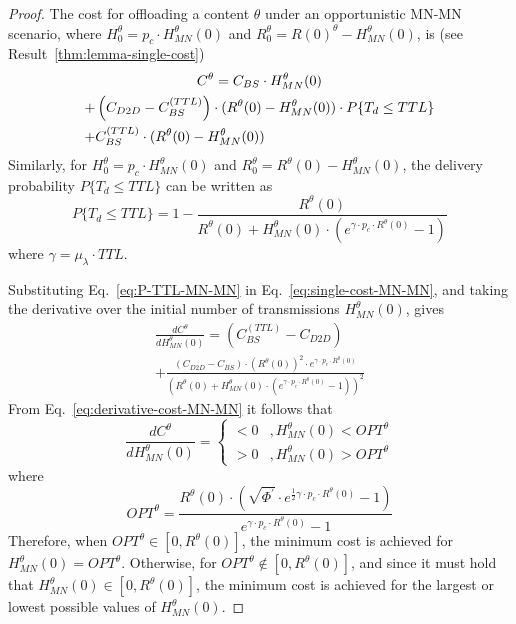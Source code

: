 \documentclass[10pt,conference,letterpaper]{IEEEtran}
\newcommand{\eq}[1]{Eq.~\eqref{#1}}
\begin{document}
\begin{proof}
The cost for offloading a content $\theta$ under an opportunistic MN-MN scenario, where $H_{0}^{\theta} = p_{c}\cdot H_{MN}^{\theta}(0)$ and $R_{0}^{\theta} = R(0)^{\theta}-H_{MN}^{\theta}(0)$, is (see Result~\ref{thm:lemma-single-cost})
\begin{multline}\label{eq:single-cost-MN-MN}
 C^{\theta} = C_{BS}\cdot H_{MN}^{\theta}(0)\\+ \left(C_{D2D}-C_{BS}^{(TTL)} \right)\cdot(R^{\theta}(0)-H_{MN}^{\theta}(0))\cdot  P\{T_{d}\leq TTL\} \\+ C_{BS}^{(TTL)} \cdot(R^{\theta}(0)-H_{MN}^{\theta}(0))\hfill~
\end{multline}
Similarly, for $H_{0}^{\theta} = p_{c}\cdot H_{MN}^{\theta}(0)$ and $R_{0}^{\theta} = R^{\theta}(0)-H_{MN}^{\theta}(0)$, the delivery probability $P\{T_{d}\leq TTL\}$ can be written as
\begin{equation}\label{eq:P-TTL-MN-MN}
 P\{T_{d}\leq TTL\} = 1- \textstyle\frac{R^{\theta}(0)}{R^{\theta}(0)+H_{MN}^{\theta}(0)\cdot \left(e^{\gamma \cdot p_{c}\cdot R^{\theta}(0)}-1\right)}
\end{equation}
where $\gamma = \mu_{\lambda}\cdot TTL$.

Substituting \eq{eq:P-TTL-MN-MN} in \eq{eq:single-cost-MN-MN}, and taking the derivative over the initial number of transmissions $H_{MN}^{\theta}(0)$, gives
\begin{multline}\label{eq:derivative-cost-MN-MN}
 \frac{dC^{\theta}}{dH_{MN}^{\theta}(0)} = (C_{BS}^{(TTL)}-C_{D2D})\\+\frac{(C_{D2D}-C_{BS})\cdot(R^{\theta}(0))^{2}\cdot e^{\gamma\cdot p_{c}\cdot R^{\theta}(0)}}{\left(R^{\theta}(0)+H_{MN}^{\theta}(0)\cdot (e^{\gamma\cdot p_{c}\cdot R^{\theta}(0)}-1)\right)^{2}}
\end{multline}
From \eq{eq:derivative-cost-MN-MN} it follows that 
\begin{equation*}
 \frac{dC^{\theta}}{dH_{MN}^{\theta}(0)} = \left\{
 \begin{array}{lc}
  <0 & ,  H_{MN}^{\theta}(0)<  OPT^{\theta}\\
  >0& ,  H_{MN}^{\theta}(0)>  OPT^{\theta}
 \end{array}
 \right.
 \end{equation*}
where
\begin{equation}
 OPT^{\theta} =\frac{R^{\theta}(0)\cdot \left(\sqrt{\Phi^{'}}\cdot e^{\frac{1}{2}\gamma\cdot p_{c}\cdot R^{\theta}(0)}-1\right)}{e^{\gamma\cdot p_{c}\cdot R^{\theta}(0)}-1}
\end{equation}
Therefore, when $OPT^{\theta}\in[0,R^{\theta}(0)]$, the minimum cost is achieved for $H_{MN}^{\theta}(0) = OPT^{\theta}$. Otherwise, for $OPT^{\theta}\notin[0,R^{\theta}(0)]$, and since it must hold that $H_{MN}^{\theta}(0)\in[0,R^{\theta}(0)]$, the minimum cost is achieved for the largest or lowest possible values of $H_{MN}^{\theta}(0)$.
\end{proof}
\end{document}

